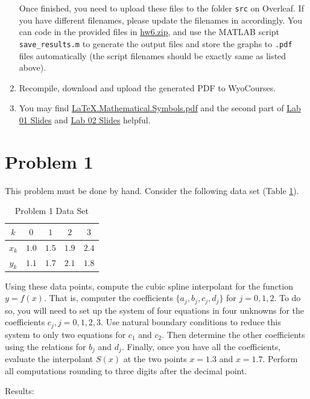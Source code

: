 \begin{enumerate}[label={\arabic*.}]
    Once finished, you need to upload these files to the folder \verb|src| on Overleaf. If you have different filenames, please update the filenames in \verb|| accordingly. You can code in the provided files in \href{https://libaoj.in/courses/2020s/MATH3340/Homework/6/hw6.zip}{hw6.zip}, and use the MATLAB script \verb|save_results.m| to generate the output files and store the graphs to \verb|.pdf| files automatically (the script filenames should be exactly same as listed above).
  \item Recompile, download and upload the generated PDF to WyoCourses.
  \item You may find \href{https://libaoj.in/files/LaTeX.Mathematical.Symbols.pdf}{\LaTeX{}.Mathematical.Symbols.pdf} and the second part of \href{https://libaoj.in/courses/2020s/MATH3341/slides/Math.3341.Lab.01.Slides.pdf}{Lab 01 Slides} and \href{https://libaoj.in/courses/2020s/MATH3341/slides/Math.3341.Lab.02.Slides.pdf}{Lab 02 Slides} helpful.
\end{enumerate}

\section{Problem 1}%
\label{sec:problem_1}
This problem must be done by hand. Consider the following data set (Table \ref{tab:1data}).
\begin{table}[!hbtp]
  \centering
  \caption{Problem 1 Data Set}
  \label{tab:1data}
  \begin{tabular}{ccccc}
    \toprule
    $k$ & $0$ & $1$ & $2$ & $3$             \\
    \midrule
    $x_{k}$ & $1.0$ & $1.5$ & $1.9$ & $2.4$ \\
    $y_{k}$ & $1.1$ & $1.7$ & $2.1$ & $1.8$ \\
    \bottomrule
  \end{tabular}
\end{table}

Using these data points, compute the cubic spline interpolant for the function $y = f(x)$. That is,  computer the coefficients $\{a_{j}, b_{j}, c_{j}, d_{j}\}$ for $j = 0, 1, 2$. To do so, you will need to set up the system of four equations in four unknowns for  the coefficients $c_{j}, j = 0, 1, 2, 3$. Use natural boundary conditions to reduce this system to only two equations for $c_{1}$ and $c_{2}$. Then determine the other coefficients using the relations for $b_{j}$ and $d_{j}$. Finally, once you have all the coefficients, evaluate  the interpolant $S(x)$ at the two points $x = 1.3$ and $x = 1.7$. Perform all computations rounding to three digits after the decimal point.
\begin{solution}
  Results:
  
  
\end{solution}

